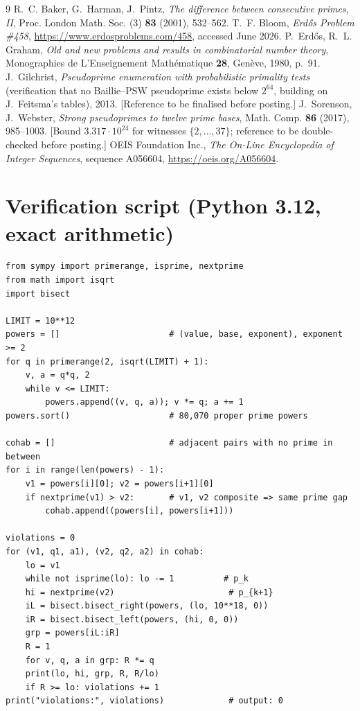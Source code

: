 \documentclass[11pt]{amsart}
\theoremstyle{definition}
\theoremstyle{remark}
\begin{document}
\begin{thebibliography}{9}
 R.~C. Baker, G.~Harman, J.~Pintz, \emph{The difference between consecutive primes, II}, Proc. London Math. Soc. (3) \textbf{83} (2001), 532--562.
 T.~F. Bloom, \emph{Erd\H{o}s Problem \#458}, \url{https://www.erdosproblems.com/458}, accessed June 2026.
 P.~Erd\H{o}s, R.~L. Graham, \emph{Old and new problems and results in combinatorial number theory}, Monographies de L'Enseignement Math\'ematique \textbf{28}, Gen\`eve, 1980, p.~91.
 J.~Gilchrist, \emph{Pseudoprime enumeration with probabilistic primality tests} (verification that no Baillie--PSW pseudoprime exists below $2^{64}$, building on J.~Feitsma's tables), 2013. [Reference to be finalised before posting.]
 J.~Sorenson, J.~Webster, \emph{Strong pseudoprimes to twelve prime bases}, Math. Comp. \textbf{86} (2017), 985--1003. [Bound $3.317\cdot10^{24}$ for witnesses $\{2,\ldots,37\}$; reference to be double-checked before posting.]
 OEIS Foundation Inc., \emph{The On-Line Encyclopedia of Integer Sequences}, sequence A056604, \url{https://oeis.org/A056604}.
\end{thebibliography}

\appendix
\section{Verification script (Python 3.12, exact arithmetic)}\label{app:script}
{\small
\begin{verbatim}
from sympy import primerange, isprime, nextprime
from math import isqrt
import bisect

LIMIT = 10**12
powers = []                      # (value, base, exponent), exponent >= 2
for q in primerange(2, isqrt(LIMIT) + 1):
    v, a = q*q, 2
    while v <= LIMIT:
        powers.append((v, q, a)); v *= q; a += 1
powers.sort()                    # 80,070 proper prime powers

cohab = []                       # adjacent pairs with no prime in between
for i in range(len(powers) - 1):
    v1 = powers[i][0]; v2 = powers[i+1][0]
    if nextprime(v1) > v2:       # v1, v2 composite => same prime gap
        cohab.append((powers[i], powers[i+1]))

violations = 0
for (v1, q1, a1), (v2, q2, a2) in cohab:
    lo = v1
    while not isprime(lo): lo -= 1          # p_k
    hi = nextprime(v2)                       # p_{k+1}
    iL = bisect.bisect_right(powers, (lo, 10**18, 0))
    iR = bisect.bisect_left(powers, (hi, 0, 0))
    grp = powers[iL:iR]
    R = 1
    for v, q, a in grp: R *= q
    print(lo, hi, grp, R, R/lo)
    if R >= lo: violations += 1
print("violations:", violations)             # output: 0
\end{verbatim}
}
\end{document}
